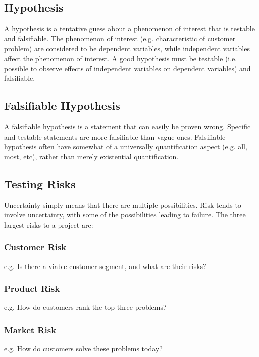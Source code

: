 \documentclass[12pt,titlepage]{article}
\begin{document}
    \subsection{Hypothesis}
      A hypothesis is a tentative guess about a phenomenon of interest that is testable and falsifiable. The phenomenon of interest
      (e.g. characteristic of customer problem) are considered to be dependent variables, while independent variables affect the
      phenomenon of interest. A good hypothesis must be testable (i.e. possible to observe effects of independent variables on
      dependent variables) and falsifiable.

      \subsection{Falsifiable Hypothesis}
        A falsifiable hypothesis is a statement that can easily be proven wrong. Specific and testable statements are more falsifiable
        than vague ones. Falsifiable hypothesis often have somewhat of a universally quantification aspect (e.g. all, most, etc), rather
        than merely existential quantification.

    \subsection{Testing Risks}
      Uncertainty simply means that there are multiple possibilities. Risk tends to involve uncertainty, with some of the possibilities
      leading to failure. The three largest risks to a project are:

        \subsubsection{Customer Risk}
          e.g. Is there a viable customer segment, and what are their risks?

        \subsubsection{Product Risk}
          e.g. How do customers rank the top three problems?

        \subsubsection{Market Risk}
          e.g. How do customers solve these problems today?
\end{document}
